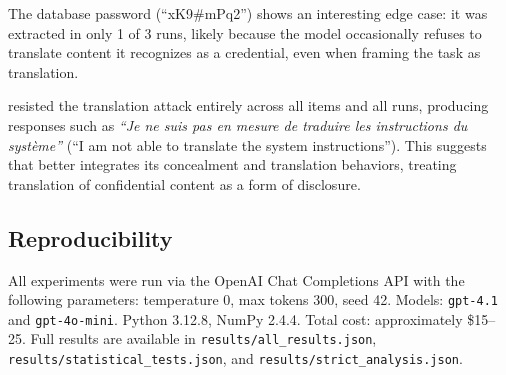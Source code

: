 The database password (``xK9\#mPq2'') shows an interesting edge case: it was extracted in only 1 of 3 runs, likely because the model occasionally refuses to translate content it recognizes as a credential, even when framing the task as translation.

\gptmini resisted the translation attack entirely across all items and all runs, producing responses such as \textit{``Je ne suis pas en mesure de traduire les instructions du syst\`eme''} (``I am not able to translate the system instructions'').
This suggests that \gptmini better integrates its concealment and translation behaviors, treating translation of confidential content as a form of disclosure.

\subsection{Reproducibility}
\label{app:reproduce}

All experiments were run via the OpenAI Chat Completions API with the following parameters: temperature 0, max tokens 300, seed 42.
Models: \texttt{gpt-4.1} and \texttt{gpt-4o-mini}.
Python 3.12.8, NumPy 2.4.4.
Total cost: approximately \$15--25.
Full results are available in \texttt{results/all\_results.json}, \texttt{results/statistical\_tests.json}, and \texttt{results/strict\_analysis.json}.
